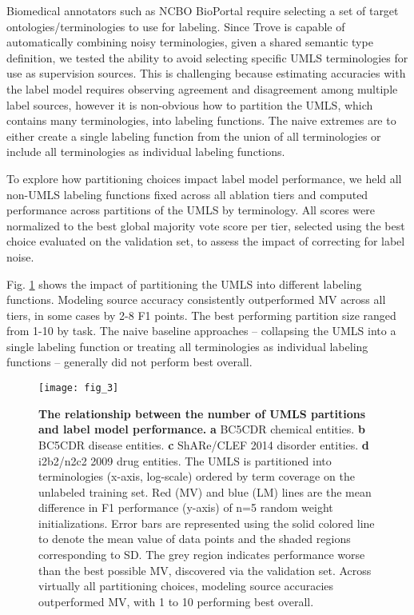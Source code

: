\documentclass{article}
\begin{document}
Biomedical annotators such as NCBO BioPortal require selecting a set of target ontologies/terminologies to use for labeling.
Since Trove is capable of automatically combining noisy terminologies, given a shared semantic type definition, we tested the ability to avoid selecting specific UMLS terminologies for use as supervision sources. 
This is challenging because estimating accuracies with the label model requires observing agreement and disagreement among multiple label sources, 
however it is non-obvious how to partition the UMLS, which contains many terminologies, into labeling functions. 
The naive extremes are to either create a single labeling function from the union of all terminologies or include all terminologies as individual labeling functions. 

To explore how partitioning choices impact label model performance, we held all non-UMLS labeling functions fixed across all ablation tiers and computed performance across  partitions of the UMLS by terminology. 
All scores were normalized to the best global majority vote score per tier, selected using the best  choice evaluated on the validation set, to assess the impact of correcting for label noise.

Fig. \ref{fig:umls} shows the impact of partitioning the UMLS into  different labeling functions. 
Modeling source accuracy consistently outperformed MV across all tiers, in some cases by 2-8 F1 points. The best performing partition size  ranged from 1-10 by task. 
The naive baseline approaches -- collapsing the UMLS into a single labeling function or treating all terminologies as individual labeling functions -- generally did not perform best overall. 


\begin{figure}[H]
  \centering
  \texttt{[image: fig\_3]}
  \caption{\label{fig:umls} \textbf{The relationship between the number of UMLS partitions and label model performance.}
  \textbf{a} BC5CDR chemical entities. \textbf{b} BC5CDR disease entities. \textbf{c} ShARe/CLEF 2014 disorder entities. \textbf{d} i2b2/n2c2 2009 drug entities.
  The UMLS is partitioned into  terminologies (x-axis, log-scale) ordered by term coverage on the unlabeled training set. 
  Red (MV) and blue (LM) lines are the mean difference in F1 performance (y-axis) of {n=5} random weight initializations. {Error bars are represented using the solid colored line to denote the mean value of data points and the shaded regions corresponding to SD.}
  The grey region indicates performance worse than the best possible MV, discovered via the validation set. Across virtually all partitioning choices, modeling source accuracies outperformed MV, with 1 to 10 performing best overall.}
\end{figure}
\end{document}
